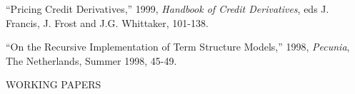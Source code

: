 \documentclass{article}
\begin{document}
\begin{etaremune}
\item ``Pricing Credit Derivatives,'' 1999, {\it Handbook of Credit
Derivatives}, eds J. Francis, J. Frost and J.G. Whittaker, 101-138.



\item
``On the Recursive Implementation of Term Structure Models,'' 
1998, {\it Pecunia}, The Netherlands, Summer 1998, 45-49.


\end{etaremune}





\begin{description}
\item[WORKING PAPERS] \mbox{}
\end{description}
\end{document}
